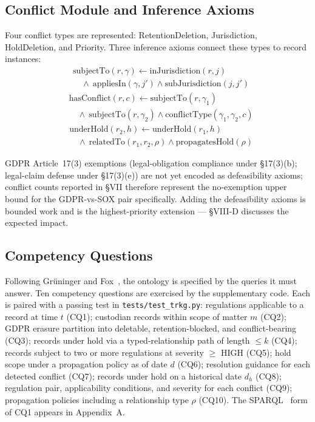 \documentclass{ieeeaccess}
\begin{document}
\subsection{Conflict Module and Inference Axioms}

Four conflict types are represented: RetentionDeletion, Jurisdiction, HoldDeletion, and Priority. Three inference axioms connect these types to record instances:
\begin{align}
&\mathrm{subjectTo}(r, \gamma) \leftarrow \mathrm{inJurisdiction}(r, j) \nonumber \\
&\quad \wedge\ \mathrm{appliesIn}(\gamma, j') \wedge \mathrm{subJurisdiction}(j, j') \tag{Ax.~1}
\end{align}
\begin{align}
&\mathrm{hasConflict}(r, c) \leftarrow \mathrm{subjectTo}(r, \gamma_1) \nonumber \\
&\quad \wedge\ \mathrm{subjectTo}(r, \gamma_2) \wedge \mathrm{conflictType}(\gamma_1, \gamma_2, c) \tag{Ax.~2}
\end{align}
\begin{align}
&\mathrm{underHold}(r_2, h) \leftarrow \mathrm{underHold}(r_1, h) \nonumber \\
&\quad \wedge\ \mathrm{relatedTo}(r_1, r_2, \rho) \wedge \mathrm{propagatesHold}(\rho) \tag{Ax.~3}
\end{align}

GDPR Article~17(3) exemptions (legal-obligation compliance under §17(3)(b); legal-claim defense under §17(3)(e)) are not yet encoded as defeasibility axioms; conflict counts reported in §VII therefore represent the no-exemption upper bound for the GDPR-vs-SOX pair specifically. Adding the defeasibility axioms is bounded work and is the highest-priority extension --- §VIII-D discusses the expected impact.

\subsection{Competency Questions}
\label{sec:cqs}

Following Gr\"{u}ninger and Fox~\cite{gruninger1995}, the ontology is specified by the queries it must answer. Ten competency questions are exercised by the supplementary code. Each is paired with a passing test in \texttt{tests/test\_trkg.py}: regulations applicable to a record at time $t$ (CQ1); custodian records within scope of matter $m$ (CQ2); GDPR erasure partition into deletable, retention-blocked, and conflict-bearing (CQ3); records under hold via a typed-relationship path of length $\leq k$ (CQ4); records subject to two or more regulations at severity $\geq$ HIGH (CQ5); hold scope under a propagation policy as of date $d$ (CQ6); resolution guidance for each detected conflict (CQ7); records under hold on a historical date $d_h$ (CQ8); regulation pair, applicability conditions, and severity for each conflict (CQ9); propagation policies including a relationship type $\rho$ (CQ10). The SPARQL~\cite{sparql} form of CQ1 appears in Appendix~A.
\end{document}
